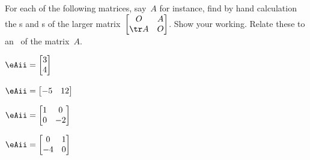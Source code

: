 \begin{exercise} \label{ex:} 
For each of the following matrices, say~\(A\) for instance, find by hand calculation the s and s of the larger matrix~\(\begin{bmatrix} O&A\\\tr A&O \end{bmatrix}\).
Show your working.
Relate these to an \svd\ of the matrix~\(A\).
\begin{parts}
\item \(\eAii=\begin{bmatrix} 3\\4 \end{bmatrix}\)

\item \(\eAii=\begin{bmatrix} -5&12 \end{bmatrix}\)

\item \(\eAii=\begin{bmatrix} 1&0\\0&-2 \end{bmatrix}\)

\item \(\eAii=\begin{bmatrix} 0&1\\-4&0 \end{bmatrix}\)

\end{parts}
\end{exercise}

